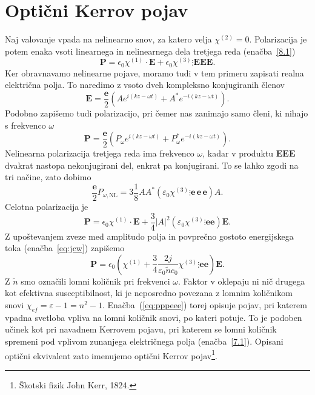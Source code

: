 \section{Optični Kerrov pojav}
\label{OKP}
Naj valovanje vpada na nelinearno snov, za katero velja $\chi^{(2)} = 0$.
Polarizacija je potem enaka vsoti linearnega in nelinearnega dela tretjega reda 
(enačba~\ref{8.1})
\begin{equation}
\mathbf{P}=
\epsilon_{0} \chi^{(1)}\cdot \mathbf{E}+
\epsilon_{0}\chi^{(3)}\vdots \mathbin \mathbf{E}\mathbin \mathbf{E}\mathbin\mathbf{E}.
\end{equation}
Ker obravnavamo nelinearne pojave, moramo tudi v tem primeru zapisati realna
električna polja. To naredimo z vsoto dveh kompleksno konjugiranih členov
\begin{equation}
\mathbf{E}=\frac{\mathbf{e}}{2}\left(Ae^{i(kz-\omega t)}+A^{*}e^{-i(kz-\omega t)}\right).
\label{8.71}
\end{equation}
Podobno zapišemo tudi polarizacijo, pri čemer nas zanimajo samo členi,
ki nihajo s frekvenco $\omega$
\begin{equation}
\mathbf{P}=\frac{\mathbf{e}}{2}\left(P_\omega e^{i(kz-\omega t)}+P_\omega^{*}e^{-i(kz-\omega t)}\right).
\label{8.71a}
\end{equation}
Nelinearna polarizacija tretjega reda ima frekvenco $\omega$, kadar v produktu 
$\mathbf{E}\mathbin \mathbf{E}\mathbin\mathbf{E}$ 
dvakrat nastopa nekonjugirani del, enkrat pa konjugirani. To se lahko zgodi na tri
načine, zato dobimo
\begin{equation}
\frac{\mathbf{e}}{2}P_{\omega,\mathrm{NL}} = 3 \frac{1}{8} A A^* \left( 
\varepsilon_0 \chi^{(3)}\vdots \mathbf{e}\, \mathbf{e} \, \mathbf{e} \right) A.
\label{pomega}
\end{equation}
Celotna polarizacija je
\begin{equation}
\mathbf{P}=
\epsilon_{0} \chi^{(1)}\cdot \mathbf{E}+\frac{3}{4} |A|^2 \left( 
\varepsilon_0 \chi^{(3)}\vdots \mathbin \mathbf{e}\mathbin \mathbf{e} \right) \mathbf{E}.
\label{eq:ptnl}
\end{equation}
Z upoštevanjem zveze med amplitudo polja in povprečno gostoto energijskega toka (enačba~\ref{eq:jcw})
zapišemo
\begin{equation}
\mathbf{P}=
\epsilon_{0} \left( \chi^{(1)} +\frac{3}{4} \frac{2  j }
{\varepsilon_0 \tilde{n} c_0} \chi^{(3)}\vdots \mathbin \mathbf{e}\mathbin 
\mathbf{e} \right) \mathbf{E}.
\label{eq:pppeee}
\end{equation}
Z $\tilde{n}$ smo označili lomni količnik pri frekvenci $\omega$. 
Faktor v oklepaju ni nič drugega kot efektivna susceptibilnost, ki je neposredno povezana
z lomnim količnikom snovi $\chi_{ef} = \varepsilon -1 =n^2 -1$. Enačba~(\ref{eq:pppeee}) 
torej opisuje pojav, 
pri katerem vpadna svetloba vpliva na lomni količnik snovi, po kateri 
potuje.
To je podoben učinek kot pri navadnem Kerrovem pojavu, pri katerem se lomni količnik 
spremeni pod vplivom zunanjega električnega polja (enačba~\ref{7.1}).
Opisani optični ekvivalent zato imenujemo optični 
Kerrov pojav\footnote{Škotski fizik John Kerr, 1824.}.

